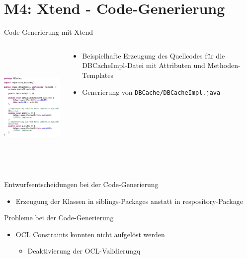 \section[M4: Xtend]{M4: Xtend - Code-Generierung}
\begin{frame}{Code-Generierung mit Xtend}
	\vspace{-5mm}
	\begin{columns}
		\begin{contentblock}{}
			\includegraphics[height=60mm]{figures/xtend.png}
		\end{contentblock}
		\begin{contentblock}{}
			\begin{itemize}
				\item Beispielhafte Erzeugung des Quellcodes für die DBCacheImpl-Datei mit Attributen und Methoden-Templates
				\item Generierung von \texttt{DBCache/DBCacheImpl.java}
			\end{itemize}
		\end{contentblock}
	\end{columns}
\end{frame}

\begin{frame}{Entwurfsentscheidungen bei der Code-Generierung}
\begin{itemize}
		\item Erzeugung der Klassen in siblings-Packages anstatt in respository-Package 
	\end{itemize}
\end{frame}

\begin{frame}{Probleme bei der Code-Generierung}
\begin{itemize}
		\item OCL Constraints konnten nicht aufgelöst werden
		\begin{itemize}
			\item Deaktivierung der OCL-Validierungq
		\end{itemize} 
\end{itemize}
\end{frame}